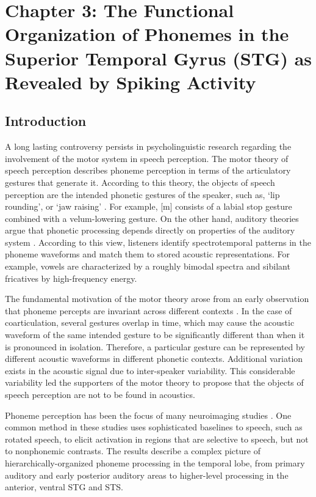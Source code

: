 \chapter{Chapter 3: The Functional Organization of Phonemes in the Superior Temporal Gyrus (STG) as Revealed by Spiking Activity}

\section{Introduction}
A long lasting controversy persists in psycholinguistic research regarding the involvement of the motor system in speech perception. The motor theory of speech perception describes phoneme perception in terms of the articulatory gestures that generate it. According to this theory, the objects of speech perception are the intended phonetic gestures of the speaker, such as, ‘lip rounding’, or ‘jaw raising’ \citep{liberman1967perception, liberman1985motor}. For example, [m] consists of a labial stop gesture combined with a velum-lowering gesture. On the other hand, auditory theories argue that phonetic processing depends directly on properties of the auditory system \citep{jakobson1951preliminaries, stevens1972quantal, stevens1989quantal, stevens2002toward}. According to this view, listeners identify spectrotemporal patterns in the phoneme waveforms and match them to stored acoustic representations. For example, vowels are characterized by a roughly bimodal spectra and sibilant fricatives by high-frequency energy.


The fundamental motivation of the motor theory arose from an early observation that phoneme percepts are invariant across different contexts \citep{cooper1952some, liberman1967perception}. In the case of coarticulation, several gestures overlap in time, which may cause the acoustic waveform of the same intended gesture to be significantly different than when it is pronounced in isolation. Therefore, a particular gesture can be represented by different acoustic waveforms in different phonetic contexts. Additional variation exists in the acoustic signal due to inter-speaker variability.  This considerable variability led the supporters of the motor theory to propose that the objects of speech perception are not to be found in acoustics.

Phoneme perception has been the focus of many neuroimaging studies \citep{liebenthal2005neural, dehaene2005neural, mottonen2006perceiving, desai2008left, liebenthal2010specialization,  formisano2008saying, binder2000human, Dewitt2012}. One common method in these studies uses sophisticated baselines to speech, such as rotated speech, to elicit activation in regions that are selective to speech, but not to nonphonemic contrasts.  The results describe a complex picture of hierarchically-organized phoneme processing in the temporal lobe, from primary auditory and early posterior auditory areas to higher-level processing in the anterior, ventral STG and STS. 

